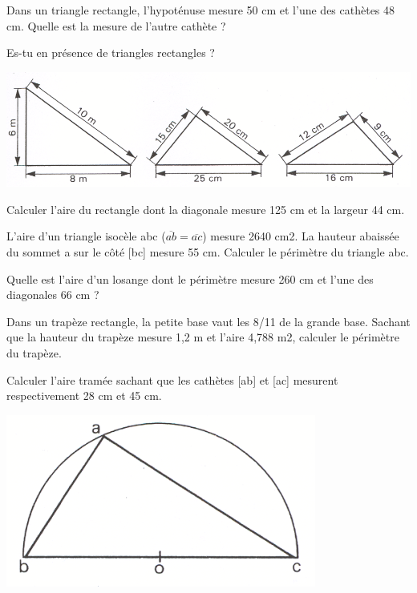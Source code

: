 \begin{exercice}
Dans un triangle rectangle, l'hypoténuse mesure 50 cm et l'une des cathètes 48 cm.
Quelle est la mesure de l'autre cathète ?
\end{exercice}

\begin{exercice}
Es-tu en présence de triangles rectangles ?

\begin{center}
\includegraphics[width = 0.4 \textwidth]{triangle/image/pyth2.png}
\end{center}



\end{exercice}

\begin{exercice}
Calculer l'aire du rectangle dont la diagonale mesure 125 cm et la largeur 44 cm.

\end{exercice}

\begin{exercice}
L'aire d'un triangle isocèle abc ($\overline{ab}=\overline{ac}$) mesure 2640 cm2. La hauteur abaissée du sommet a sur le côté [bc] mesure 55 cm.
Calculer le périmètre du triangle abc.

\end{exercice}

\begin{exercice}
Quelle est l'aire d'un losange dont le périmètre mesure 260 cm et l'une des diagonales 66 cm ?

\end{exercice}

\begin{exercice}
Dans un trapèze rectangle, la petite base vaut les 8/11 de la grande base. Sachant que la hauteur du trapèze mesure 1,2 m et l'aire 4,788 m2, calculer le périmètre du trapèze.

\end{exercice}

\begin{exercice}
Calculer l'aire tramée sachant que les cathètes [ab] et [ac] mesurent respectivement 28 cm et 45 cm.
\begin{center}
\includegraphics[width = 0.4 \textwidth]{triangle/image/pyth7.png}
\end{center}
\end{exercice}

